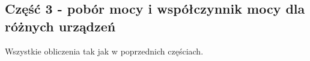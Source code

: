 \documentclass[11pt]{article}
\begin{document}
    \subsection*{Część 3 - pobór mocy i współczynnik mocy dla różnych urządzeń}
    \noindnet Wszystkie obliczenia tak jak w poprzednich częściach.
    \begin{center}
    \end{center}
\end{document}
